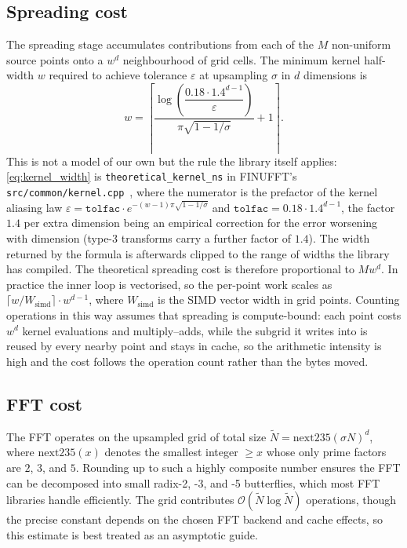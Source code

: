 \subsection{Spreading cost}

The spreading stage accumulates contributions from each of the $M$ non-uniform source points onto a $w^d$ neighbourhood of grid cells. The minimum kernel half-width $w$ required to achieve tolerance $\varepsilon$ at upsampling $\sigma$ in $d$ dimensions is
\begin{equation}
    w = \left\lceil \frac{\log\!\left(\dfrac{0.18 \cdot 1.4^{d-1}}{\varepsilon}\right)}{\pi \sqrt{1 - 1/\sigma}} + 1 \right\rceil.
    \label{eq:kernel_width}
\end{equation}
This is not a model of our own but the rule the library itself applies: \eqref{eq:kernel_width} is \texttt{theoretical\_kernel\_ns} in FINUFFT's \texttt{src/common/kernel.cpp}~\cite{finufftsoftware}, where the numerator is the prefactor of the kernel aliasing law $\varepsilon = \texttt{tolfac}\cdot e^{-(w-1)\pi\sqrt{1-1/\sigma}}$ and $\texttt{tolfac} = 0.18 \cdot 1.4^{d-1}$, the factor $1.4$ per extra dimension being an empirical correction for the error worsening with dimension (type-3 transforms carry a further factor of $1.4$). The width returned by the formula is afterwards clipped to the range of widths the library has compiled.
The theoretical spreading cost is therefore proportional to $M w^d$. In practice the inner loop is vectorised, so the per-point work scales as $\lceil w / W_{\mathrm{simd}} \rceil \cdot w^{d-1}$, where $W_{\mathrm{simd}}$ is the SIMD vector width in grid points. Counting operations in this way assumes that spreading is compute-bound: each point costs $w^d$ kernel evaluations and multiply--adds, while the subgrid it writes into is reused by every nearby point and stays in cache, so the arithmetic intensity is high and the cost follows the operation count rather than the bytes moved.

\subsection{FFT cost}

The FFT operates on the upsampled grid of total size $\tilde{N} = \mathrm{next235}(\sigma N)^d$, where $\mathrm{next235}(x)$ denotes the smallest integer $\geq x$ whose only prime factors are $2$, $3$, and $5$. Rounding up to such a highly composite number ensures the FFT can be decomposed into small radix-2, -3, and -5 butterflies, which most FFT libraries handle efficiently. The grid contributes $\mathcal{O}(\tilde{N} \log \tilde{N})$ operations, though the precise constant depends on the chosen FFT backend and cache effects, so this estimate is best treated as an asymptotic guide.

